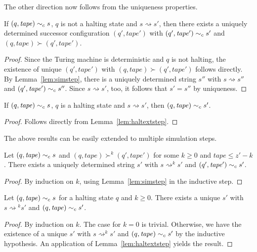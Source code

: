 \documentclass[a4paper,UKenglish,cleveref, autoref]{lipics-v2019}
\newcommand{\strent}{\rightsquigarrow}
\begin{document}
The other direction now follows from the uniqueness properties. 

\begin{lemma}\label{lem:stepinv}
  If $(q, \mathit{tape}) \sim_c{} s$, $q$ is not a halting state and $s \strent{} s'$, then there exists a uniquely determined successor configuration $(q', \mathit{tape}')$ with $(q', \mathit{tape}') \sim_c{} s'$ and $(q, \mathit{tape}) \succ (q', \mathit{tape}')$. 
\end{lemma}
\begin{proof}
  Since the Turing machine is deterministic and $q$ is not halting, the existence of unique $(q', \mathit{tape}')$ with $(q, \mathit{tape}) \succ (q', \mathit{tape}')$ follows directly. By Lemma~\ref{lem:simstep}, there is a uniquely determined string $s''$ with $s \strent{} s''$ and $(q', \mathit{tape}') \sim_c{} s''$. Since $s \strent{} s'$, too, it follows that $s' = s''$ by uniqueness.
\end{proof}

\begin{lemma}\label{lem:haltinv}
  If $(q, \mathit{tape}) \sim_c{} s$, $q$ is a halting state and $s \strent{} s'$, then $(q, \mathit{tape}) \sim_c{} s'$. 
\end{lemma}
\begin{proof}
  Follows directly from Lemma~\ref{lem:haltextstep}. 
\end{proof}

The above results can be easily extended to multiple simulation steps. 
\begin{lemma}\label{lem:mssim}
  Let $(q, \mathit{tape}) \sim_c{} s$ and $(q, \mathit{tape}) \succ^k (q', \mathit{tape}')$ for some $k \ge 0$ and $\mathit{tape} \le z' - k$. There exists a uniquely determined string $s'$ with $s \strent^k s'$ and $(q', \mathit{tape}') \sim_c{} s'$. 
\end{lemma}
\begin{proof}
  By induction on $k$, using Lemma~\ref{lem:simstep} in the inductive step.
\end{proof}

\begin{lemma}\label{lem:haltext}
  Let $(q, \mathit{tape}) \sim_c{} s$ for a halting state $q$ and $k \ge 0$. There exists a unique $s'$ with $s \strent{}^k s'$ and $(q, \mathit{tape}) \sim_c{} s'$. 
\end{lemma}
\begin{proof}
  By induction on $k$. The case for $k = 0$ is trivial.
  Otherwise, we have the existence of a unique $s'$ with $s \strent^k s'$ and $(q, \mathit{tape}) \sim_c{} s'$ by the inductive hypothesis. An application of Lemma~\ref{lem:haltextstep} yields the result.
\end{proof}
\end{document}
